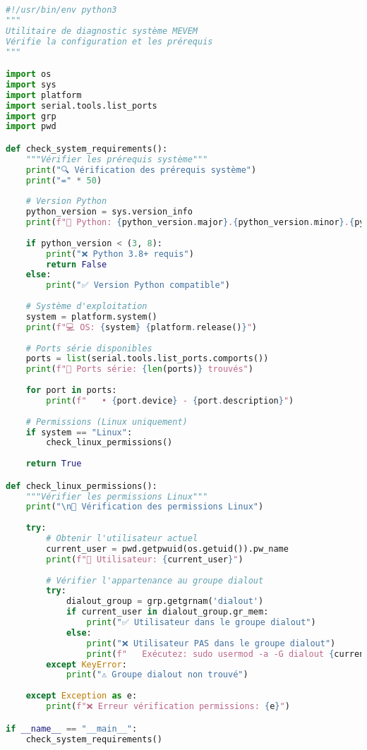\documentclass[12pt,a4paper]{article}
\begin{document}
\begin{lstlisting}[language=python, caption=Utilitaire de diagnostic système]
#!/usr/bin/env python3
"""
Utilitaire de diagnostic système MEVEM
Vérifie la configuration et les prérequis
"""

import os
import sys
import platform
import serial.tools.list_ports
import grp
import pwd

def check_system_requirements():
    """Vérifier les prérequis système"""
    print("🔍 Vérification des prérequis système")
    print("=" * 50)
    
    # Version Python
    python_version = sys.version_info
    print(f"🐍 Python: {python_version.major}.{python_version.minor}.{python_version.micro}")
    
    if python_version < (3, 8):
        print("❌ Python 3.8+ requis")
        return False
    else:
        print("✅ Version Python compatible")
    
    # Système d'exploitation
    system = platform.system()
    print(f"💻 OS: {system} {platform.release()}")
    
    # Ports série disponibles
    ports = list(serial.tools.list_ports.comports())
    print(f"🔌 Ports série: {len(ports)} trouvés")
    
    for port in ports:
        print(f"   • {port.device} - {port.description}")
    
    # Permissions (Linux uniquement)
    if system == "Linux":
        check_linux_permissions()
    
    return True

def check_linux_permissions():
    """Vérifier les permissions Linux"""
    print("\n🔐 Vérification des permissions Linux")
    
    try:
        # Obtenir l'utilisateur actuel
        current_user = pwd.getpwuid(os.getuid()).pw_name
        print(f"👤 Utilisateur: {current_user}")
        
        # Vérifier l'appartenance au groupe dialout
        try:
            dialout_group = grp.getgrnam('dialout')
            if current_user in dialout_group.gr_mem:
                print("✅ Utilisateur dans le groupe dialout")
            else:
                print("❌ Utilisateur PAS dans le groupe dialout")
                print(f"   Exécutez: sudo usermod -a -G dialout {current_user}")
        except KeyError:
            print("⚠️ Groupe dialout non trouvé")
    
    except Exception as e:
        print(f"❌ Erreur vérification permissions: {e}")

if __name__ == "__main__":
    check_system_requirements()
\end{lstlisting}
\end{document}
